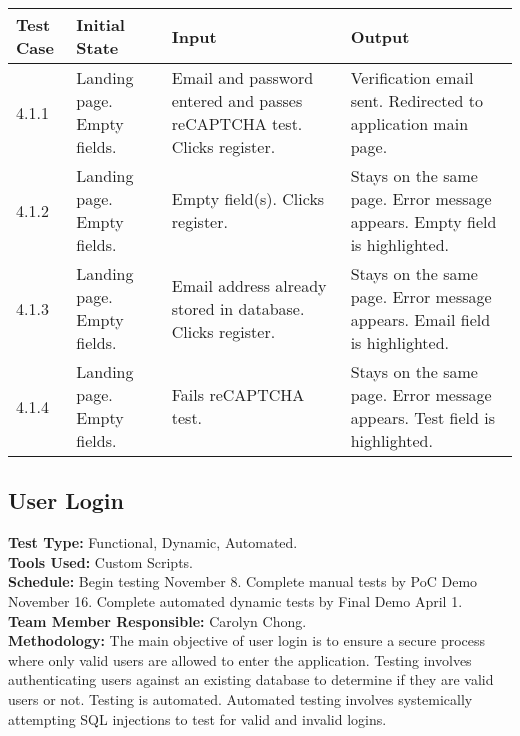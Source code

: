 \documentclass[12pt]{article}
\begin{document}
\begin{longtable}{|p{2cm}|p{3cm}|p{5cm}|p{5cm}|}
\hline
\textbf{Test Case}  & \textbf{Initial State} & \textbf{Input} & \textbf{Output} \\ \hline
4.1.1 & Landing page. Empty fields. & Email and password entered and passes reCAPTCHA test. Clicks register. & Verification email sent. Redirected to application main page. \\ 
\hline
4.1.2 & Landing page. Empty fields. & Empty field(s). Clicks register. & Stays on the same page. Error message appears. Empty field is highlighted. \\
\hline
4.1.3 & Landing page. Empty fields. & Email address already stored in database. Clicks register. & Stays on the same page. Error message appears. Email field is highlighted. \\
\hline
4.1.4 & Landing page. Empty fields. & Fails reCAPTCHA test. & Stays on the same page. Error message appears. Test field is highlighted. \\
\hline
\end{longtable}



\subsection{User Login}
\textbf{Test Type:} Functional, Dynamic, Automated. \\
\textbf{Tools Used:} Custom Scripts. \\
\textbf{Schedule:} Begin testing November 8. Complete manual tests by PoC Demo November 16. Complete automated dynamic tests by Final Demo April 1. \\
\textbf{Team Member Responsible:} Carolyn Chong. \\
\textbf{Methodology:} The main objective of user login is to ensure a secure process where only valid users are allowed to enter the application. Testing involves authenticating users against an existing database to determine if they are valid users or not. Testing is automated. Automated testing involves systemically attempting SQL injections to test for valid and invalid logins.
\end{document}
